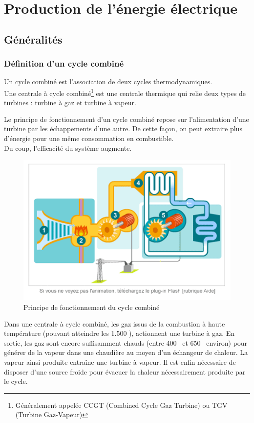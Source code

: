 \chapter{Production de l'énergie électrique}
\section{Généralités}
\subsection{Définition d'un cycle combiné}
Un cycle combiné est l'association de  deux cycles thermodynamiques. \\
Une centrale à cycle combiné\footnote{Généralement appelée CCGT (Combined Cycle Gaz Turbine) ou TGV (Turbine Gaz-Vapeur)} est une centrale thermique qui relie deux types de turbines : turbine à gaz et turbine à vapeur.

Le principe de fonctionnement d'un cycle combiné repose sur l'alimentation d'une turbine par les échappements d'une autre. De cette façon, on peut extraire plus d'énergie pour une même consommation en combustible.\\ Du coup, l'efficacité du système augmente.     %
\begin{figure}[h]
\centering
\includegraphics[scale=0.5]{./Figures/principe_cycle_combine.png}
\caption{Principe de fonctionnement du cycle combiné}
\end{figure}

Dans une centrale à cycle combiné, les gaz issus de la combustion à haute température (pouvant atteindre les 1.500 \textcelsius), actionnent une turbine à gaz. En sortie, les gaz sont encore suffisamment chauds (entre 400 \textcelsius\  et 650 \textcelsius\ environ) pour générer de la vapeur dans une chaudière au moyen d'un échangeur de chaleur. La vapeur ainsi produite entraîne une turbine à vapeur. Il est enfin nécessaire de disposer d'une source froide pour évacuer la chaleur nécessairement produite par le cycle. 

